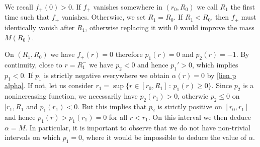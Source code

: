 \documentclass[11pt,a4paper]{article}
\numberwithin{equation}{section}
\theoremstyle{plain}
\theoremstyle{remark}
\begin{document}
 We recall $f_{+}(0)>0$. If $f_{+}$ vanishes somewhere in $(r_0,R_0)$ we call $R_1$ the first time such that $f_{+}$ vanishes. Otherwise, we set $R_1=R_0$. If $R_1<R_0$, then $f_{+}$ must identically vanish after $R_1$, otherwise replacing it with $0$ would improve the mass $M(R_0)$. 

On $(R_1,R_0)$ we have $f_{+}(r)=0$ therefore $p_{1}(r)=0$ and $p_{2}(r)=-1$. By continuity, close to $r=R_1^-$ we have $p_2<0$ and hence $p_1'>0$, which implies $p_1<0$. If $p_1$ is strictly negative everywhere we obtain $\alpha(r)=0$ by \eqref{lien p alpha}. If not, let us consider $r_1=\sup\{r\in[r_0,R_1]\,:\, p_1(r)\geq 0\}$. Since $p_2$ is a nonincreasing function, we necessarily have $p_2(r_1)>0$, otherwie $p_2\leq 0$ on $[r_1,R_1$ and $p_1(r_1)<0$. But this implies that $p_2$ is strictly positive on $[r_0,r_1]$ and hence $p_1(r)>p_1(r_1)=0$ for all $r<r_1$. On this interval we then deduce $\alpha=M$. In particular, it is important to observe that we do not have non-trivial intervals on which $p_1=0$, where it would be impossible to deduce the value of $\alpha$.


\end{document}
